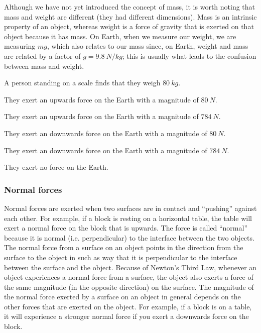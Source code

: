Although we have not yet introduced the concept of mass, it is worth noting that mass and weight are different (they had different dimensions). Mass is an intrinsic property of an object, whereas weight is a force of gravity that is exerted on that object because it has mass. On Earth, when we measure our weight, we are measuring $mg$, which also relates to our mass since, on Earth, weight and mass are related by a factor of $g=\SI{9.8}{N/kg}$; this is usually what leads to the confusion between mass and weight.

\begin{checkpointMC}{A person standing on a scale finds that they weigh $\SI{80}{kg}$.}
\item They exert an upwards force on the Earth with a magnitude of $\SI{80}{N}$.
\item They exert an upwards force on the Earth with a magnitude of $\SI{784}{N}$.%
\item They exert an downwards force on the Earth with a magnitude of $\SI{80}{N}$.
\item They exert an downwards force on the Earth with a magnitude of $\SI{784}{N}$.
\item They exert no force on the Earth.
\end{checkpointMC}


\subsubsection{Normal forces}
Normal forces are exerted when two surfaces are in contact and ``pushing'' against each other. For example, if a block is resting on a horizontal table, the table will exert a normal force on the block that is upwards. The force is called ``normal'' because it is normal (i.e. perpendicular) to the interface between the two objects. The normal force from a surface on an object points in the direction from the surface to the object in such as way that it is perpendicular to the interface between the surface and the object. Because of Newton's Third Law, whenever an object experiences a normal force from a surface, the object also exerts a force of the same magnitude (in the opposite direction) on the surface. The magnitude of the normal force exerted by a surface on an object in general depends on the other forces that are exerted on the object. For example, if a block is on a table, it will experience a stronger normal force if you exert a downwards force on the block.

